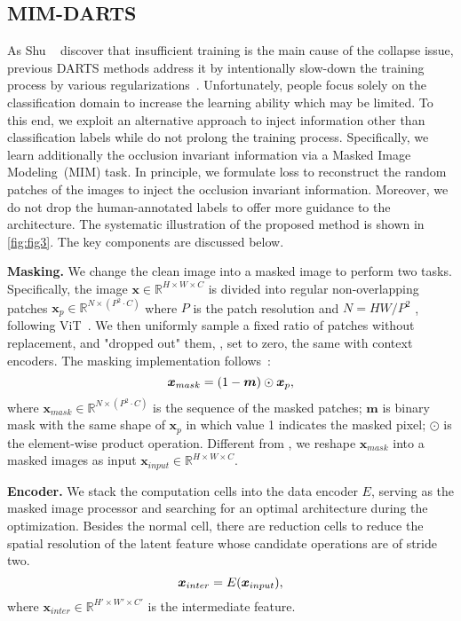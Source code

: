 \documentclass[10pt,twocolumn,letterpaper]{article}
\newcommand{\mypara}[1]{\vspace{1mm}\noindent\textbf{#1}}
\begin{document}
\subsection{MIM-DARTS}
\vspace{-4pt}
\label{sec:2tasks}
As Shu \etal~\cite{shu_2020_understanding} discover that insufficient training is the main cause of the collapse issue,
previous DARTS methods address it by intentionally slow-down the training process by various regularizations~\cite{chen_2020_sdarts,ye_2022_beta,liang2019darts+,Chen_2019_pdarts}.
Unfortunately, people focus solely on the classification domain to increase the learning ability which may be limited. To this end, we exploit an alternative approach to inject information other than classification labels while do not prolong the training process.
Specifically, we learn additionally the occlusion invariant information via a Masked Image Modeling~(MIM) task.
In principle, we formulate loss to reconstruct the random patches of the images to inject the occlusion invariant information.
Moreover, we do not drop the human-annotated labels to offer more guidance to the architecture.
The systematic illustration of the proposed method is shown in \cref{fig:fig3}.
The key components are discussed below.

\mypara{Masking.}
We change the clean image into a masked image to perform two tasks.
Specifically, the image $\bm{x} \in \mathbb{R}^{H \times W \times C}$ is divided into regular non-overlapping patches $\bm{x}_{p} \in \mathbb{R}^{N \times (P^{2}\cdot C)}$ where $P$ is the patch resolution and $N = HW/P^{2}$
, following ViT~\cite{dosovitskiy2021vit}.
We then uniformly sample a fixed ratio of patches without replacement, and "dropped out" them, \ie, set to zero, the same with context encoders\cite{Pathak_2016_Inpainting}.
The masking implementation follows~\cite{He_2022_mae}:
\begin{equation}
  \bm{x}_{mask} = (1-\bm{m})\odot \bm{x}_p,
  \vspace{-4pt}
  \label{eq:mask}
\end{equation}
where $\bm{x}_{mask} \in \mathbb{R}^{N \times (P^{2}\cdot C)}$ is the sequence of the masked patches; $\bm{m}$ is binary mask with the same shape of $\bm{x}_{p}$ in which value 1 indicates the masked pixel; $\odot$ is the element-wise product operation.
Different from \cite{He_2022_mae}, we reshape $\bm{x}_{mask}$ into a masked images as input $\bm{x}_{input} \in \mathbb{R}^{H \times W \times C}$.

\mypara{Encoder.}
We stack the computation cells into the data encoder $E$, serving as the masked image processor and searching for an optimal architecture during the optimization.
Besides the normal cell, there are reduction cells to reduce the spatial resolution of the latent feature whose candidate operations are of stride two.
\vspace{-4pt}
\begin{equation}
  \bm{x}_{inter} = E(\bm{x}_{input}),
  \vspace{-4pt}
  \label{eq:encoder}
\end{equation}
where $\bm{x}_{inter} \in \mathbb{R}^{H' \times W' \times C'}$ is the intermediate feature.
\end{document}
